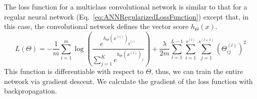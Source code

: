 The loss function for a multiclass convolutional network is similar to that for a regular neural network (Eq.~\ref{eq:ANNRegularizedLossFunction}) except that, in this case, the convolutional network defines the vector score $h_\Theta(x)$.
\begin{equation}
	L(\Theta) = -\frac{1}{m} \sum_{i=1}^m \log \left ( \frac{ e^{h_\Theta(x^{(i)})_{y^{(i)}}} }{ \sum_{j=1}^K e^{ h_\Theta (x^{(i)})_j} } \right ) + \frac{\lambda}{2m}\sum_{l=1}^{L-1}\sum_{i=1}^{s^{(l)}}\sum_{j=1}^{s^{(l+1)}} \left(\Theta^{(l)}_{ij}\right)^2
	\label{eq:ConvNetLossFunction}
\end{equation}
This function is differentiable with respect to $\Theta$, thus, we can train the entire network via gradient descent. We calculate the gradient of the loss function with backpropagation.%

